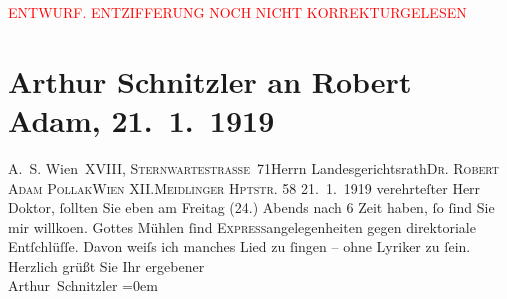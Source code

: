 
\begin{center}
            \textcolor{red}{ENTWURF. ENTZIFFERUNG NOCH NICHT KORREKTURGELESEN}
                      \end{center}
            
               \section[Arthur Schnitzler an Robert Adam, 21. 1. 1919]{ Arthur Schnitzler an Robert Adam, 21. 1. 1919}\nopagebreak{}\rehead{ }\begin{ledgroupsized}[t]{13cm}\normalsize\beginnumbering{} \toendnotes[C]{\smallbreak\pagebreak[2]} 
\pstart{}{\pb}A. S. Wien XVIII, \textsc{Sternwartestrasse} 71\pend{}{\bigskip}\pstart{}Herrn Landesgerichtsrath\pend{}\pstart{}\textsc{Dr. Robert Adam Pollak}\pend{}\pstart{}\textsc{Wien} XII.\pend{}\pstart{}\textsc{Meidlinger Hptstr.} 58\pend{}{\bigskip}\pstart
           \raggedleft{}{\pb}21. 1. 1919\pend
           \pstart{}verehrteſter Herr Doktor,\pend\pstart
           ſollten Sie eben am Freitag (24.) Abends nach
                        6 Zeit haben, ſo ſind Sie mir willko{\geminationm}en.
                    Gottes Mühlen ſind \textsc{Express}angelegenheiten gegen
                    direktoriale Entſchlüſſe. Davon weiſs ich manches Lied zu ſingen – ohne Lyriker
                    zu ſein.\pend
           \pstart
           Herzlich grüßt Sie Ihr ergebener{\\[\baselineskip]}\spacefill\mbox{Arthur Schnitzler}\pend
           \leftskip=0em{}\endnumbering{}\end{ledgroupsized}  \newcommand{\dateiname}{L02320}\newcommand{\titel}{Arthur Schnitzler an Robert Adam, 21. 1. 1919}\newcommand{\editorInnen}{Martin Anton Müller und Gerd-Hermann Susen}
      